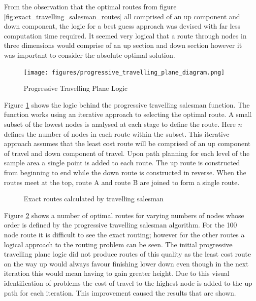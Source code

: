 \documentclass[a4paper,12pt,twoside]{article}
\begin{document}
From the observation that the optimal routes from figure \ref{fig:exact_travelling_salesman_routes} all comprised of an up component and down component, the logic for a best guess approach was devised with far less computation time required. It seemed very logical that a route through nodes in three dimensions would comprise of an up section and down section however it was important to consider the absolute optimal solution.

\begin{figure}
\centering
\texttt{[image: figures/progressive\_travelling\_plane\_diagram.png]} 
\caption{Progressive Travelling Plane Logic}
\label{fig:progressive_travelling_plane_diagram}
\end{figure}

Figure \ref{fig:progressive_travelling_plane_diagram} shows the logic behind the progressive travelling salesman function. The function works using an iterative approach to selecting the optimal route. A small subset of the lowest nodes is analysed at each stage to define the route. Here $n$ defines the number of nodes in each route within the subset. This iterative approach assumes that the least cost route will be comprised of an up component of travel and down component of travel. Upon path planning for each level of the sample area a single point is added to each route. The up route is constructed from beginning to end while the down route is constructed in reverse. When the routes meet at the top, route A and route B are joined to form a single route.

\begin{figure}
	\centering
	
	\caption{Exact routes calculated by travelling salesman}
	\label{fig:exact_routes_calculated_by_travelling_salesman}
\end{figure}

Figure \ref{fig:exact_routes_calculated_by_travelling_salesman} shows a number of optimal routes for varying numbers of nodes whose order is defined by the progressive travelling salesman algorithm. For the 100 node route it is difficult to see the exact routing; however for the other routes a logical approach to the routing problem can be seen. The initial progressive travelling plane logic did not produce routes of this quality as the least cost route on the way up would always favour finishing lower down even though in the next iteration this would mean having to gain greater height. Due to this visual identification of problems the cost of travel to the highest node is added to the up path for each iteration. This improvement caused the results that are shown.
\end{document}
